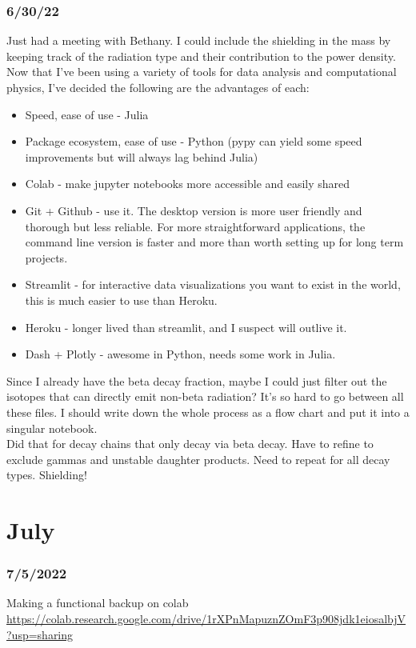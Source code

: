 \documentclass[12pt]{article}
\begin{document}
\subsubsection{6/30/22}
Just had a meeting with Bethany. I could include the shielding in the mass by keeping track of the radiation type and their contribution to the power density. \\
Now that I've been using a variety of tools for data analysis and computational physics, I've decided the following are the advantages of each:
\begin{itemize}
    \item Speed, ease of use - Julia
    \item Package ecosystem, ease of use - Python (pypy can yield some speed improvements but will always lag behind Julia)
    \item Colab - make jupyter notebooks more accessible and easily shared
    \item Git + Github - use it. The desktop version is more user friendly and thorough but less reliable. For more straightforward applications, the command line version is faster and more than worth setting up for long term projects. 
    \item Streamlit - for interactive data visualizations you want to exist in the world, this is much easier to use than Heroku. 
    \item Heroku - longer lived than streamlit, and I suspect will outlive it. 
    \item Dash + Plotly - awesome in Python, needs some work in Julia. 
\end{itemize}

Since I already have the beta decay fraction, maybe I could just filter out the isotopes that can directly emit non-beta radiation? It's so hard to go between all these files. I should write down the whole process as a flow chart and put it into a singular notebook. \\
Did that for decay chains that only decay via beta decay. Have to refine to exclude gammas and unstable daughter products. Need to repeat for all decay types. Shielding!\\
\section{July}
\subsubsection{7/5/2022}
Making a functional backup on colab \href{https://colab.research.google.com/drive/1rXPnMapuznZOmF3p908jdk1eiosalbjV?usp=sharing}{https://colab.research.google.com/drive/1rXPnMapuznZOmF3p908jdk1eiosalbjV?usp=sharing}\\
\end{document}
